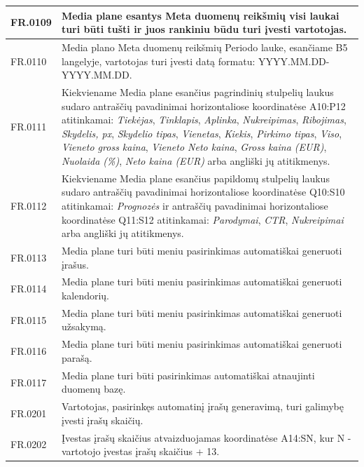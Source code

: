 {\begin{longtable}{|L{2cm}|L{13.5cm}|}
FR.0109 &
Media plane esantys Meta duomenų reikšmių visi laukai turi būti tušti ir juos rankiniu būdu turi įvesti vartotojas.
\\ \hline
  
FR.0110 &
Media plano Meta duomenų reikšmių Periodo lauke, esančiame B5 langelyje, vartotojas turi įvesti datą formatu: YYYY.MM.DD-YYYY.MM.DD.
\\ \hline
  
FR.0111 &
Kiekviename Media plane esančius pagrindinių stulpelių laukus sudaro antraščių pavadinimai horizontaliose koordinatėse A10:P12 atitinkamai: \textit{Tiekėjas}, \textit{Tinklapis}, \textit{Aplinka}, \textit{Nukreipimas}, \textit{Ribojimas}, \textit{Skydelis, px}, \textit{Skydelio tipas}, \textit{Vienetas}, \textit{Kiekis}, \textit{Pirkimo tipas}, \textit{Viso}, \textit{Vieneto gross kaina}, \textit{Vieneto Neto kaina}, \textit{Gross kaina (EUR)}, \textit{Nuolaida (\%)}, \textit{Neto kaina (EUR)}  arba angliški jų atitikmenys.
\\ \hline
  
FR.0112 &
Kiekviename Media plane esančius papildomų stulpelių laukus sudaro antraščių pavadinimai horizontaliose koordinatėse Q10:S10 atitinkamai: \textit{Prognozės} ir antraščių pavadinimai horizontaliose koordinatėse Q11:S12 atitinkamai: \textit{Parodymai}, \textit{CTR}, \textit{Nukreipimai} arba angliški jų atitikmenys.
\\ \hline  
  
FR.0113 &
Media plane turi būti meniu pasirinkimas automatiškai generuoti įrašus.
\\ \hline  
  
FR.0114 &
Media plane turi būti meniu pasirinkimas automatiškai generuoti kalendorių.
\\ \hline  
  
FR.0115 &
Media plane turi būti meniu pasirinkimas automatiškai generuoti užsakymą.
\\ \hline  
  
FR.0116 &
Media plane turi būti meniu pasirinkimas automatiškai generuoti parašą.
\\ \hline  

FR.0117 &
Media plane turi būti pasirinkimas automatiškai atnaujinti duomenų bazę.
\\ \hline  
  
FR.0201 &
Vartotojas, pasirinkęs automatinį įrašų generavimą, turi galimybę įvesti įrašų skaičių.
\\ \hline  

FR.0202 &
Įvestas įrašų skaičius atvaizduojamas koordinatėse A14:SN, kur N - vartotojo įvestas įrašų skaičius + 13.
\\ \hline  
  

\end{longtable}}
